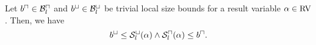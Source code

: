 \begin{theorem}
  Let $b^\sqcap \in \mathcal{B}^\sqcap_l$ and $b^\sqcup \in \mathcal{B}^\sqcup_l$ be trivial local size bounds for a result variable $\alpha \in \text{RV}$.
  Then, we have
  \[ b^\sqcup \leq {\mathcal{S}^\sqcup_l}(\alpha) \wedge {\mathcal{S}^\sqcap_l}(\alpha) \leq b^\sqcap. \]
\end{theorem}
